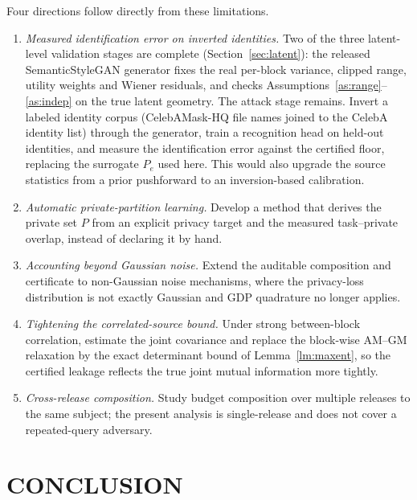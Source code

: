 \documentclass{ieeetj}
\theoremstyle{plain}
\theoremstyle{definition}
\begin{document}
Four directions follow directly from these limitations.

\begin{enumerate}
\item[(F1)] \emph{Measured identification error on inverted identities.} Two of the three latent-level validation stages are complete
(Section~\ref{sec:latent}): the released SemanticStyleGAN generator fixes the real per-block
variance, clipped range, utility weights and Wiener residuals, and checks
Assumptions~\ref{as:range}--\ref{as:indep} on the true latent geometry. The attack stage remains. Invert a
labeled identity corpus (CelebAMask-HQ file names joined to the CelebA identity list)
through the generator, train a recognition head on held-out identities, and measure the
identification error against the certified floor, replacing the surrogate $P_e$ used here.
This would also upgrade the source statistics from a prior pushforward to an
inversion-based calibration. \item[(F2)] \emph{Automatic private-partition learning.} Develop a method that derives the private
set $P$ from an explicit privacy target and the measured task--private overlap, instead
of declaring it by hand. \item[(F3)] \emph{Accounting beyond Gaussian noise.} Extend the auditable composition and
certificate to non-Gaussian noise mechanisms, where the privacy-loss distribution is not
exactly Gaussian and GDP quadrature no longer applies. \item[(F4)] \emph{Tightening the correlated-source bound.} Under strong
between-block correlation, estimate the joint covariance and replace the block-wise
AM--GM relaxation by the exact determinant bound of Lemma~\ref{lm:maxent}, so the certified leakage
reflects the true joint mutual information more tightly. \item[(F5)] \emph{Cross-release composition.} Study budget
composition over multiple releases to the same subject; the present analysis is
single-release and does not cover a repeated-query adversary.
\end{enumerate}

\section{CONCLUSION}
\label{sec:conclusion}
\end{document}
